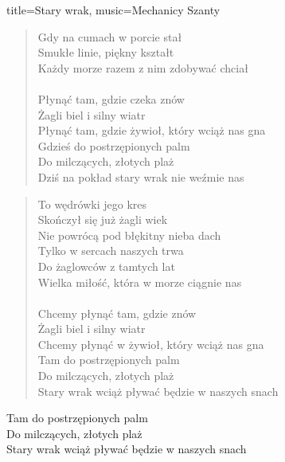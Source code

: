 \begin{song}{title={Stary wrak}, music={Mechanicy Szanty}}
\begin{multicols}{2}
\begin{verse}
        Gdy na cumach w porcie stał \\
        Smukłe linie, piękny kształt \\
        Każdy morze razem z nim zdobywać chciał \\
        \\
        Płynąć tam, gdzie czeka znów \\
        Żagli biel i silny wiatr \\
        Płynąć tam, gdzie żywioł, który wciąż nas gna \\
        Gdzieś do postrzępionych palm \\
        Do milczących, złotych plaż \\
        Dziś na pokład stary wrak nie weźmie nas
    \end{verse}
    \begin{verse}
        To wędrówki jego kres \\
        Skończył się już żagli wiek \\
        Nie powrócą pod błękitny nieba dach \\
        Tylko w sercach naszych trwa \\
        Do żaglowców z tamtych lat \\
        Wielka miłość, która w morze ciągnie nas \\
        \\
        Chcemy płynąć tam, gdzie znów \\
        Żagli biel i silny wiatr \\
        Chcemy płynąć w żywioł, który wciąż nas gna \\
        Tam do postrzępionych palm \\
        Do milczących, złotych plaż \\
        Stary wrak wciąż pływać będzie w naszych snach
    \end{verse}
    \begin{interlude}
        Tam do postrzępionych palm \\
        Do milczących, złotych plaż \\
        Stary wrak wciąż pływać będzie w naszych snach
    \end{interlude}
    \end{multicols}
\end{song}

